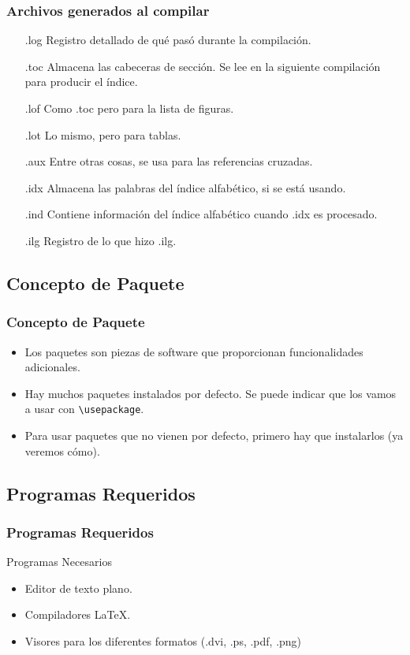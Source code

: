 \documentclass[aspectratio=43]{beamer}%
\begin{document}
\begin{frame}[fragile]
\frametitle{\textbf{Archivos generados al compilar}}
\justifying
 \begin{itemize}\justifying
  \item [.log] Registro detallado de qué pasó durante la compilación.
  \item [.toc] Almacena las cabeceras de sección. Se lee en la siguiente compilación para producir el índice.
  \item [.lof] Como .toc pero para la lista de figuras.
  \item [.lot] Lo mismo, pero para tablas.
  \item [.aux] Entre otras cosas, se usa para las referencias cruzadas.
  \item [.idx] Almacena las palabras del índice alfabético, si se está usando.
  \item [.ind] Contiene información del índice alfabético cuando .idx es procesado.
  \item [.ilg] Registro de lo que hizo .ilg.
\end{itemize}

\end{frame}

\subsection{Concepto de Paquete}
\begin{frame}[fragile]
\frametitle{\textbf{Concepto de Paquete}}
\justifying
 \begin{itemize}\justifying
  \item Los paquetes son piezas de software que proporcionan funcionalidades adicionales.
  \item Hay muchos paquetes instalados por defecto. Se puede indicar que los vamos a usar con \verb+\usepackage+.
  \item Para usar paquetes que no vienen por defecto, primero hay que instalarlos (ya veremos cómo).
\end{itemize}

\end{frame}

\subsection{Programas Requeridos}
\begin{frame}[fragile]
\frametitle{\textbf{Programas Requeridos}}
\justifying
 \begin{block}{Programas Necesarios}
\begin{itemize}\justifying
  \item Editor de texto plano.
  \item Compiladores \LaTeX{}.
  \item Visores para los diferentes formatos (.dvi, .ps, .pdf, .png)
\end{itemize}

\end{block}
\end{frame}
\end{document}
